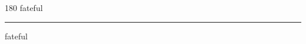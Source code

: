 
\begin{frame}
\begin{center}
\begin{turn}{180}
{\fontsize{2.5cm}{1em}\selectfont fateful}
\end{turn}
\vspace{1em}\par  
\hrule
\vspace{1em}\par  
{\fontsize{2.5cm}{1em}\selectfont fateful}
\end{center}
\end{frame}

